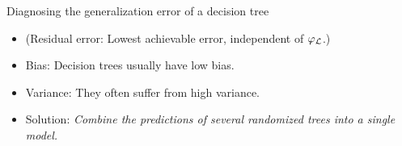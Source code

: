 \documentclass{beamer}
\begin{document}
\begin{frame}{Diagnosing the generalization error of a decision tree}

\begin{itemize}
\item (Residual error: Lowest achievable error, independent of $\varphi_{\cal L}$.)
\item Bias: Decision trees usually have {\color{blue} low bias}.
\item Variance: They often suffer from {\color{red} high variance}.
\end{itemize}

\begin{itemize}
\item Solution: {\it Combine the predictions of several randomized trees into a single model.}
\end{itemize}

\end{frame}


\end{document}
